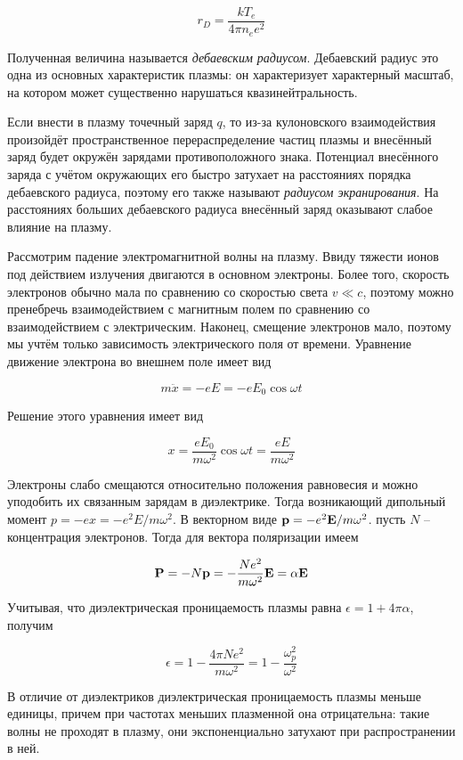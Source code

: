 \begin{equation}
    r_D = \frac{k T_e}{4 \pi n_e e^2}
\end{equation}

\noindent
Полученная величина называется \textit{дебаевским радиусом}. Дебаевский радиус это одна из основных характеристик плазмы: он характеризует характерный масштаб, на котором может существенно нарушаться квазинейтральность.

Если внести в плазму точечный заряд $q$, то из-за кулоновского взаимодействия произойдёт пространственное перераспределение частиц плазмы и внесённый заряд будет окружён зарядами противоположного знака. Потенциал внесённого заряда с учётом окружающих его быстро затухает на расстояниях порядка дебаевского радиуса, поэтому его также называют \textit{радиусом экранирования}. На расстояниях больших дебаевского радиуса внесённый заряд оказывают слабое влияние на плазму.

Рассмотрим падение электромагнитной волны на плазму. Ввиду тяжести ионов под действием излучения двигаются в основном электроны. Более того, скорость электронов обычно мала по сравнению со скоростью света $v \ll c$, поэтому можно пренебречь взаимодействием с магнитным полем по сравнению со взаимодействием с электрическим. Наконец, смещение электронов мало, поэтому мы учтём только зависимость электрического поля от времени. Уравнение движение электрона во внешнем поле имеет вид

\begin{equation*}
    m \ddot x = -e E = - e E_0 \cos \omega t
\end{equation*}

\noindent
Решение этого уравнения имеет вид

\begin{equation*}
    x = \frac{e E_0}{m \omega^2} \cos \omega t = \frac{e E}{m \omega^2}
\end{equation*}

Электроны слабо смещаются относительно положения равновесия и можно уподобить их связанным зарядам в диэлектрике. Тогда возникающий дипольный момент $p = -e x = - e^2 E / m \omega^2$. В векторном виде $\mathbf p = - e^2 \mathbf E / m \omega^2$. пусть $N$ -- концентрация электронов. Тогда для вектора поляризации имеем

\begin{equation}
    \mathbf P = - N \mathbf p = - \frac{N e^2}{m \omega^2} \mathbf E = \alpha \mathbf E
\end{equation}

\noindent
Учитывая, что диэлектрическая проницаемость плазмы равна $\epsilon = 1 + 4 \pi \alpha$, получим

\begin{equation}
    \epsilon = 1 - \frac{4 \pi N e^2}{m \omega^2} = 1 - \frac{\omega_p^2}{\omega^2}
\end{equation}

В отличие от диэлектриков диэлектрическая проницаемость плазмы меньше единицы, причем при частотах меньших плазменной она отрицательна: такие волны не проходят в плазму, они экспоненциально затухают при распространении в ней.